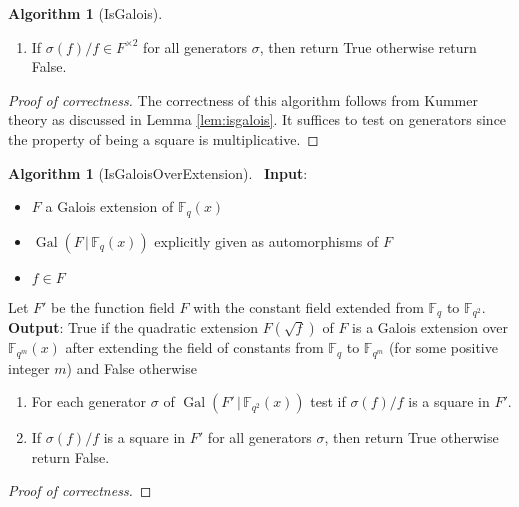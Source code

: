 \documentclass{dcthesis}
\newcommand{\FF}{\mathbb{F}}
\DeclareMathOperator{\Gal}{Gal}
\numberwithin{equation}{section}
\theoremstyle{definition}
\newtheorem{alg}[equation]{Algorithm}
\theoremstyle{remark}
\begin{document}
{{{\begin{alg}[IsGalois]
\begin{enumerate}
          in $F^\times$.
        \item
          If $\sigma(f)/f\in F^{\times 2}$
          for all generators $\sigma$,
          then return \textsf{True}
          otherwise return \textsf{False}.
      \end{enumerate}
    \end{alg}
    \begin{proof}[Proof of correctness]
      The correctness of this algorithm
      follows from Kummer theory
      as discussed in
      Lemma \ref{lem:isgalois}.
      It suffices to test on generators
      since the property of being a square
      is multiplicative.
    \end{proof}
    \begin{alg}[IsGaloisOverExtension]
      \label{alg:isgaloisoverextension}
      \,
      \newline
      \textbf{Input}:
      \begin{itemize}
        \item
          $F$ a Galois extension of
          $\FF_q(x)$
        \item
          $\Gal(F\,|\,\FF_q(x))$
          explicitly given
          as automorphisms of $F$
        \item
          $f\in F$
      \end{itemize}
      Let $F'$ be the function field $F$
      with the constant field
      extended
      from $\FF_q$ to $\FF_{q^2}$.
      \textbf{Output}:
      \textsf{True} if the quadratic extension
      $F(\sqrt{f})$ of $F$
      is a Galois extension over $\FF_{q^m}(x)$
      after extending the field of constants
      from $\FF_q$ to $\FF_{q^m}$
      (for some positive integer $m$)
      and \textsf{False} otherwise
      \begin{enumerate}
        \item
          For each generator
          $\sigma$ of $\Gal(F'\,|\,\FF_{q^2}(x))$
          test if $\sigma(f)/f$ is a square
          in $F'$.
        \item
          If $\sigma(f)/f$ is a square in $F'$
          for all generators $\sigma$,
          then return \textsf{True}
          otherwise return \textsf{False}.
      \end{enumerate}
    \end{alg}
    \begin{proof}[Proof of correctness]

\end{proof}}}}
\end{document}
